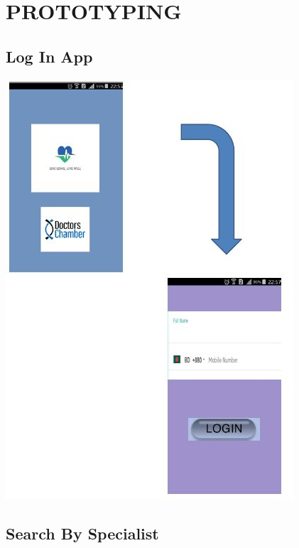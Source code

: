\documentclass[12pt]{article}
\begin{document}
\section{PROTOTYPING}

\subsection{Log In App}

\includegraphics[scale = 0.99]{login.JPG}\\[1.0 cm]
\pagebreak

\subsection {Search By Specialist}
\end{document}

